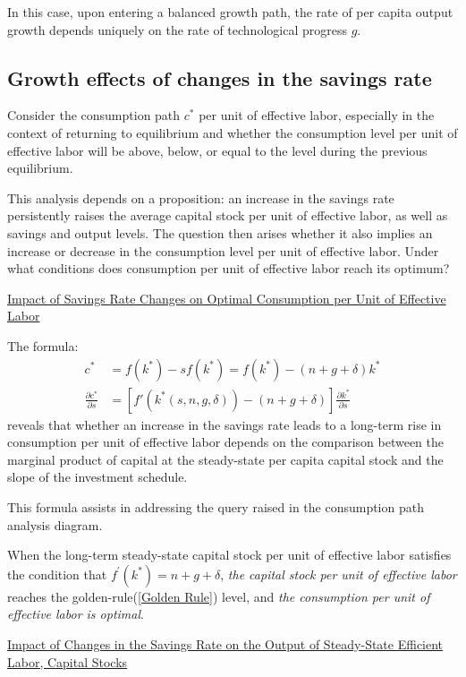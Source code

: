 In this case, upon entering a balanced growth path, 
the rate of per capita output growth depends uniquely on the rate of technological progress $g$.

\subsection{Growth effects of changes in the savings rate}
Consider the consumption path $c^*$ per unit of effective labor, especially in the context of returning to equilibrium and whether the consumption level per unit of effective labor will be above, below, or equal to the level during the previous equilibrium.

This analysis depends on a proposition: an increase in the savings rate persistently raises the average capital stock per unit of effective labor, as well as savings and output levels. The question then arises whether it also implies an increase or decrease in the consumption level per unit of effective labor. Under what conditions does consumption per unit of effective labor reach its optimum?

\underline{Impact of Savings Rate Changes on Optimal Consumption per Unit of Effective Labor}

The formula:
\begin{align*}
    c^* &= f(k^*) - s f(k^*) = f(k^*) - (n + g + \delta) k^* \\
    \frac{\partial c^*}{\partial s} &= \left[f'(k^*(s, n, g, \delta)) - (n + g + \delta) \right] \frac{\partial k^*}{\partial s}
\end{align*}
reveals that whether an increase in the savings rate leads to a long-term rise in consumption per unit of effective labor 
depends on the comparison between the marginal product of capital at the steady-state per capita capital stock and the slope of the investment schedule. 

This formula assists in addressing the query raised in the consumption path analysis diagram.

When the long-term steady-state capital stock per unit of effective labor satisfies the condition that $f^{\prime} (k^*) = n + g + \delta$, 
\textit{the capital stock per unit of effective labor} reaches the golden-rule(\ref{Golden Rule}) level, 
and \textit{the consumption per unit of effective labor is optimal}.

\underline{Impact of Changes in the Savings Rate on the Output of Steady-State Efficient Labor, Capital Stocks}

